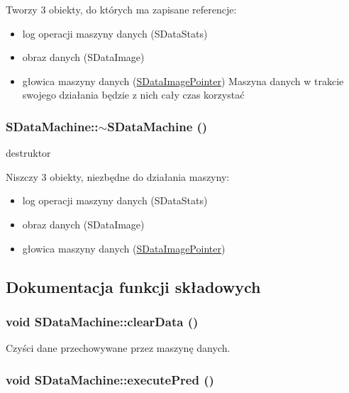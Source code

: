 Tworzy 3 obiekty, do których ma zapisane referencje:\begin{itemize}
\item log operacji maszyny danych (SDataStats)\item obraz danych (SDataImage)\item głowica maszyny danych (\hyperlink{classSDataImagePointer}{SDataImagePointer}) Maszyna danych w trakcie swojego działania będzie z nich cały czas korzystać \end{itemize}
\hypertarget{classSDataMachine_59bc85b25930729cbe3046e81f49f909}{
\subsubsection[{$\sim$SDataMachine}]{\setlength{\rightskip}{0pt plus 5cm}SDataMachine::$\sim$SDataMachine ()}}
\label{classSDataMachine_59bc85b25930729cbe3046e81f49f909}


destruktor 

Niszczy 3 obiekty, niezbędne do działania maszyny:\begin{itemize}
\item log operacji maszyny danych (SDataStats)\item obraz danych (SDataImage)\item głowica maszyny danych (\hyperlink{classSDataImagePointer}{SDataImagePointer}) \end{itemize}


\subsection{Dokumentacja funkcji składowych}
\hypertarget{classSDataMachine_b863ea9a42568d7555cc146ded9f2d88}{
\subsubsection[{clearData}]{\setlength{\rightskip}{0pt plus 5cm}void SDataMachine::clearData ()}}
\label{classSDataMachine_b863ea9a42568d7555cc146ded9f2d88}


Czyści dane przechowywane przez maszynę danych. \hypertarget{classSDataMachine_87cfad868b3ea0a0e60f776ad3773678}{
\subsubsection[{executePred}]{\setlength{\rightskip}{0pt plus 5cm}void SDataMachine::executePred ()}}
\label{classSDataMachine_87cfad868b3ea0a0e60f776ad3773678}


